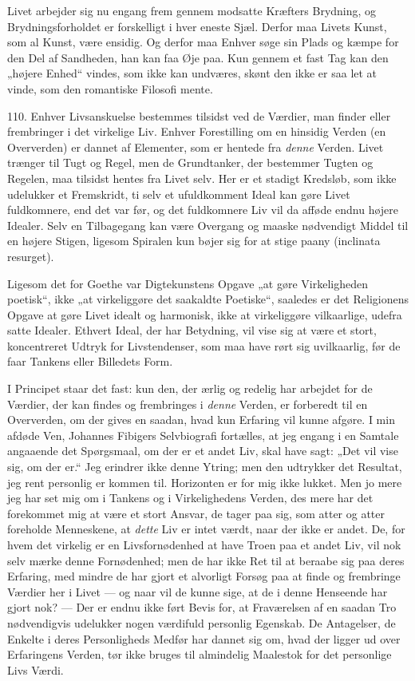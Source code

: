 \documentclass[12pt,a4paper,openany]{book}
\newcommand{\opage}[1]{\marginnote{\footnotesize\textit{[#1]}}}
\begin{document}
Livet arbejder sig nu engang frem gennem modsatte Kræfters Brydning, og
Brydningsforholdet er forskelligt i hver eneste Sjæl. Derfor maa Livets
Kunst, som al Kunst, være ensidig. Og derfor maa Enhver søge sin Plads
og kæmpe for den Del af Sandheden, han kan faa Øje paa. Kun gennem et
fast Tag kan den „højere Enhed“ vindes, som ikke kan undværes, skønt den
ikke er saa let at vinde, som den romantiske Filosofi mente.

110. Enhver Livsanskuelse bestemmes tilsidst ved de Værdier, man finder
eller frembringer i det virkelige Liv. Enhver Forestilling om en
hinsidig Verden (en Oververden) er dannet af Elementer, som er hentede
fra \textit{denne} Verden. Livet trænger til Tugt og Regel, men de
Grundtanker, der bestemmer Tugten og Regelen, maa tilsidst hentes fra
Livet selv. Her er et stadigt Kredsløb, som ikke udelukker et
Fremskridt, ti selv et ufuldkomment Ideal kan gøre Livet fuldkomnere,
end det var før, og det fuldkomnere Liv vil da afføde endnu højere
Idealer. Selv en Tilbagegang kan være Overgang og maaske nødvendigt
Middel til en højere Stigen, ligesom Spiralen kun bøjer sig for at stige
paany (inclinata resurget).

Ligesom det for Goethe var Digtekunstens Opgave „at gøre Virkeligheden
poetisk“, ikke „at virkeliggøre det saakaldte Poetiske“, saaledes er det
Religionens Opgave at gøre Livet idealt og harmonisk, ikke at
virkeliggøre vilkaarlige, udefra satte Idealer. Ethvert Ideal, der har
Betydning, vil vise sig at være et stort, koncentreret Udtryk for
Livstendenser, som maa have rørt sig uvilkaarlig, før de faar Tankens
eller Billedets Form.

I Principet staar det fast: kun den, der ærlig og redelig har arbejdet
for de Værdier, der kan findes og frembringes i \textit{denne} Verden,
er forberedt til en Oververden, om der gives en saadan, hvad kun
Erfaring vil kunne afgøre. I min afdøde Ven, Johannes Fibigers
Selvbiografi fortælles, at jeg engang i en Samtale angaaende det
Spørgsmaal, om der er et andet Liv, skal have sagt: „Det vil vise sig,
om der er.“ Jeg erindrer ikke denne Ytring; men den udtrykker det
Resultat, jeg rent personlig er kommen til. Horizonten er for mig ikke
lukket. Men jo mere jeg har set mig om i Tankens og i Virkelighedens
Verden, des mere har det forekommet mig at være et stort Ansvar, de
tager paa sig, som atter og atter foreholde Menneskene, at
\textit{dette} Liv
\opage{243}er intet værdt, naar der ikke er andet. De, for hvem det
virkelig er en Livsfornødenhed at have Troen paa et andet Liv, vil nok
selv mærke denne Fornødenhed; men de har ikke Ret til at beraabe sig paa
deres Erfaring, med mindre de har gjort et alvorligt Forsøg paa at finde
og frembringe Værdier her i Livet --- og naar vil de kunne sige, at de i
denne Henseende har gjort nok? --- Der er endnu ikke ført Bevis for, at
Fraværelsen af en saadan Tro nødvendigvis udelukker nogen værdifuld
personlig Egenskab. De Antagelser, de Enkelte i deres Personligheds
Medfør har dannet sig om, hvad der ligger ud over Erfaringens Verden,
tør ikke bruges til almindelig Maalestok for det personlige Livs Værdi.
\end{document}
